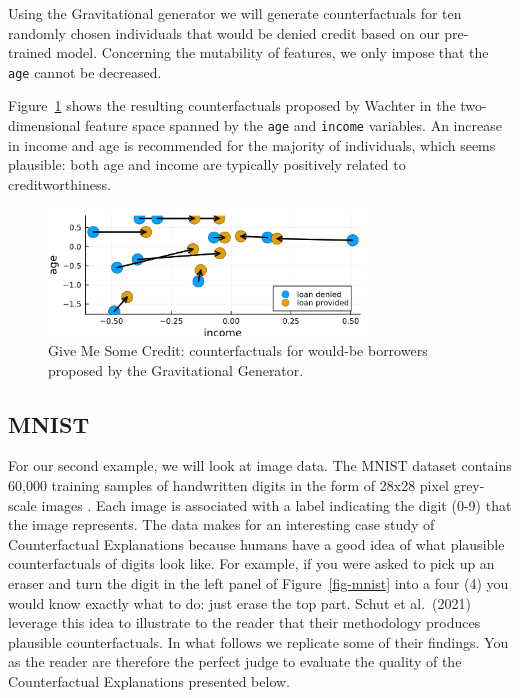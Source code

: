 \documentclass[
  letterpaper,
  DIV=11,
  numbers=noendperiod]{scrartcl}
\begin{document}
Using the Gravitational generator \cite{altmeyer2023endogenous} we will
generate counterfactuals for ten randomly chosen individuals that would
be denied credit based on our pre-trained model. Concerning the
mutability of features, we only impose that the \texttt{age} cannot be
decreased.

Figure~\ref{fig-credit} shows the resulting counterfactuals proposed by
Wachter in the two-dimensional feature space spanned by the \texttt{age}
and \texttt{income} variables. An increase in income and age is
recommended for the majority of individuals, which seems plausible: both
age and income are typically positively related to creditworthiness.

\begin{figure}

{\centering \includegraphics[width=3.33333in,height=1.33333in]{www/credit.png}

}

\caption{\label{fig-credit}Give Me Some Credit: counterfactuals for
would-be borrowers proposed by the Gravitational Generator.}

\end{figure}

\hypertarget{mnist}{%
\subsection{MNIST}\label{mnist}}

For our second example, we will look at image data. The MNIST dataset
contains 60,000 training samples of handwritten digits in the form of
28x28 pixel grey-scale images \cite{lecun1998mnist}. Each image is
associated with a label indicating the digit (0-9) that the image
represents. The data makes for an interesting case study of
Counterfactual Explanations because humans have a good idea of what
plausible counterfactuals of digits look like. For example, if you were
asked to pick up an eraser and turn the digit in the left panel of
Figure~\ref{fig-mnist} into a four (4) you would know exactly what to
do: just erase the top part. Schut et al.~(2021)
\cite{schut2021generating} leverage this idea to illustrate to the
reader that their methodology produces plausible counterfactuals. In
what follows we replicate some of their findings. You as the reader are
therefore the perfect judge to evaluate the quality of the
Counterfactual Explanations presented below.
\end{document}
